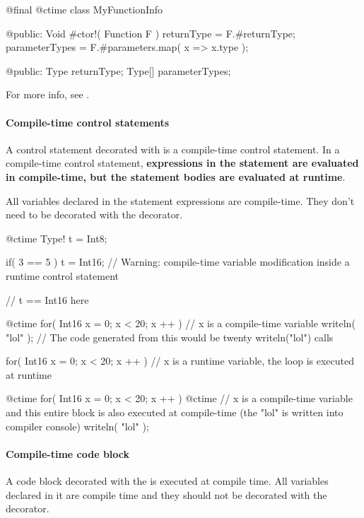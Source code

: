 \begin{code}
@final @ctime class MyFunctionInfo {

@public:
	Void #ctor!( Function F ) {
		returnType = F.#returnType;
		parameterTypes = F.#parameters.map( x => x.type );
	}
	
@public:
	Type returnType;
	Type[] parameterTypes;	
	
}
\end{code}

For more info, see .

\paragraph{Compile-time control statements}
A control statement decorated with  is a compile-time control statement. In a compile-time control statement, \textbf{expressions in the statement are evaluated in compile-time, but the statement bodies are evaluated at runtime}.

All variables declared in the statement expressions are compile-time. They don't need to be decorated with the  decorator.

\begin{code}
@ctime Type! t = Int8;

if( 3 == 5 )
	t = Int16; // Warning: compile-time variable modification inside a runtime control statement

// t == Int16 here
\end{code}

\begin{code}
@ctime for( Int16 x = 0; x < 20; x ++ ) {
	// x is a compile-time variable
	writeln( "lol" );
	// The code generated from this would be twenty writeln("lol") calls
}

for( Int16 x = 0; x < 20; x ++ ) {
	// x is a runtime variable, the loop is executed at runtime	
}

@ctime for( Int16 x = 0; x < 20; x ++ ) @ctime {
	// x is a compile-time variable and this entire block is also executed at compile-time (the "lol" is written into compiler console)
	writeln( "lol" );
}

\end{code}

\paragraph{Compile-time code block} A code block decorated with the  is executed at compile time. All variables declared in it are compile time and they should not be decorated with the  decorator.

